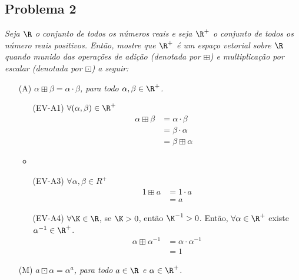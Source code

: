 \subsection*{Problema 2}

\textit{
  Seja $\R$  o conjunto de  todos os números  reais e seja  $\R^{+}$ o
  conjunto de todos os número reais \textit{positivos}.  Então, mostre
  que  $\R^{+}$ é  um espaço  vetorial  sobre $\R$  quando munido  das
  operações de  adição (denotada  por $\boxplus$) e  multiplicação por
  escalar (denotada por $\boxdot$) a seguir:}
\begin{itemize}
\item[(A)]  \textit{$\alpha \boxplus \beta  = \alpha  \cdot \beta$,  para todo
  $\alpha, \beta \in \R^+$.}
    \begin{itemize}
        \item [(EV-A1)] $\forall (\alpha, \beta) \in \R^+$
            \begin{align*}
                \alpha \boxplus \beta &= \alpha \cdot \beta & \\
                 &= \beta \cdot \alpha \\
                 &= \beta \boxplus \alpha
            \end{align*}
        \item
        
        \item[(EV-A3)] $\forall \alpha, \beta \in R^{+}$ \\
            \begin{align*}
            1 \boxplus a &= 1 \cdot a \\
            &= a
            \end{align*}
        \item[(EV-A4)] $\forall \K \in \R$, se $\K >0$, então $\K^{-1} > 0$. Então, $\forall \alpha \in \R^{+}$ existe $\alpha^{-1} \in \R^{+}$.
            \begin{align*}
            \alpha \boxplus \alpha^{-1} &= \alpha \cdot \alpha^{-1} \\
            &= 1
            \end{align*}
    \end{itemize}
\item[(M)]  \textit{$a \boxdot  \alpha =  \alpha^a$, para  todo $a  \in  \R$ e $\alpha \in \R^+$.}
\end{itemize}
